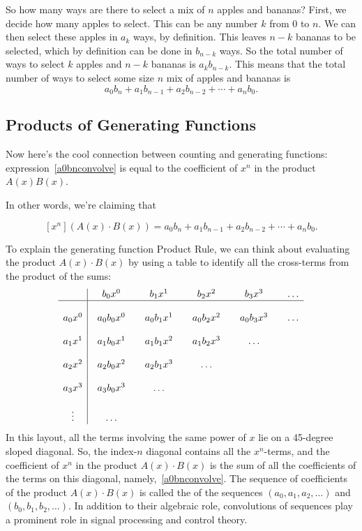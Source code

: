 So how many ways are there to select a mix of $n$ apples and bananas?
First, we decide how many apples to select.  This can be any number
$k$ from 0 to $n$.  We can then select these apples in $a_k$ ways, by
definition.  This leaves $n-k$ bananas to be selected, which by
definition can be done in $b_{n-k}$ ways.  So the total number of ways
to select $k$ apples and $n-k$ bananas is $a_kb_{n-k}$.  This means
that the total number of ways to select some size $n$ mix of apples
and bananas is
\begin{equation}\label{a0bnconvolve}
a_0b_n + a_1b_{n-1} + a_2b_{n-2} + \cdots + a_nb_0.
\end{equation}

\subsection{Products of Generating Functions}
Now here's the cool connection between counting and generating
functions: expression~\eqref{a0bnconvolve} is equal to the coefficient
of $x^n$ in the product $A(x)B(x)$.

In other words, we're claiming that
\begin{rul*}[Product]
\begin{equation}\label{xnAxBx}
[x^n](A(x)\cdot B(x)) = a_0b_n + a_1b_{n-1} + a_2b_{n-2} + \cdots +
a_nb_0.
\end{equation}
\end{rul*}
To explain the generating function Product Rule, we can think about
evaluating the product $A(x) \cdot B(x)$ by using a table to identify
all the cross-terms from the product of the sums:
\[
\begin{array}{c|@{\quad}c@{\qquad}c@{\qquad}c@{\qquad}c@{\qquad}c}
      & b_0 x^0 & b_1 x^1 & b_2 x^2 & b_3 x^3 & \dots \\
\hline
\\
a_0 x^0 & a_0 b_0 x^0 & a_0 b_1 x^1 & a_0 b_2 x^2 & a_0 b_3 x^3 & \dots \\
\\
a_1 x^1 & a_1 b_0 x^1 & a_1 b_1 x^2 & a_1 b_2 x^3 & \dots \\
\\
a_2 x^2 & a_2 b_0 x^2 & a_2 b_1 x^3 & \dots \\
\\
a_3 x^3 & a_3 b_0 x^3 & \dots \\
\\
\vdots & \dots\\
\end{array}
\]
In this layout, all the terms involving the same power of $x$ lie on a
45-degree sloped diagonal.  So, the index-$n$ diagonal contains all the
$x^n$-terms, and the coefficient of $x^n$ in the product $A(x)\cdot
B(x)$ is the sum of all the coefficients of the terms on this
diagonal, namely,~\eqref{a0bnconvolve}.  The sequence of coefficients
of the product $A(x)\cdot B(x)$ is called the  of
the sequences $(a_0, a_1, a_2, \dots)$ and $(b_0, b_1, b_2, \dots)$.
In addition to their algebraic role, convolutions of sequences play a
prominent role in signal processing and control theory.

